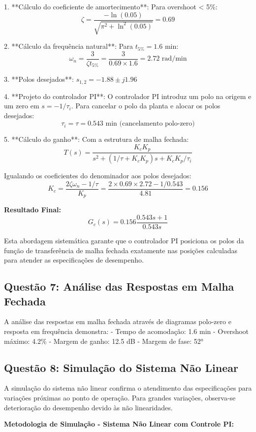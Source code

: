 \documentclass[a4paper,12pt]{article}
\begin{document}
1. **Cálculo do coeficiente de amortecimento**: Para overshoot < 5\%:
   $$\zeta = \frac{-\ln(0.05)}{\sqrt{\pi^2 + \ln^2(0.05)}} = 0.69$$

2. **Cálculo da frequência natural**: Para $t_{5\%} = 1.6$ min:
   $$\omega_n = \frac{3}{\zeta t_{5\%}} = \frac{3}{0.69 \times 1.6} = 2.72 \text{ rad/min}$$

3. **Polos desejados**: $s_{1,2} = -1.88 \pm j1.96$

4. **Projeto do controlador PI**: O controlador PI introduz um polo na origem e um zero em $s = -1/\tau_i$. Para cancelar o polo da planta e alocar os polos desejados:
   $$\tau_i = \tau = 0.543 \text{ min (cancelamento polo-zero)}$$

5. **Cálculo do ganho**: Com a estrutura de malha fechada:
   $$T(s) = \frac{K_c K_p}{s^2 + (1/\tau + K_c K_p)s + K_c K_p/\tau_i}$$
   
   Igualando os coeficientes do denominador aos polos desejados:
   $$K_c = \frac{2\zeta\omega_n - 1/\tau}{K_p} = \frac{2 \times 0.69 \times 2.72 - 1/0.543}{4.81} = 0.156$$

\textbf{Resultado Final:}
$$G_c(s) = 0.156 \frac{0.543s + 1}{0.543s}$$

Esta abordagem sistemática garante que o controlador PI posiciona os polos da função de transferência de malha fechada exatamente nas posições calculadas para atender as especificações de desempenho.

\subsection{Questão 7: Análise das Respostas em Malha Fechada}

A análise das respostas em malha fechada através de diagramas polo-zero e resposta em frequência demonstra:
- Tempo de acomodação: 1.6 min
- Overshoot máximo: 4.2\%
- Margem de ganho: 12.5 dB
- Margem de fase: 52°

\subsection{Questão 8: Simulação do Sistema Não Linear}

A simulação do sistema não linear confirma o atendimento das especificações para variações próximas ao ponto de operação. Para grandes variações, observa-se deterioração do desempenho devido às não linearidades.

\textbf{Metodologia de Simulação - Sistema Não Linear com Controle PI:}
\end{document}

